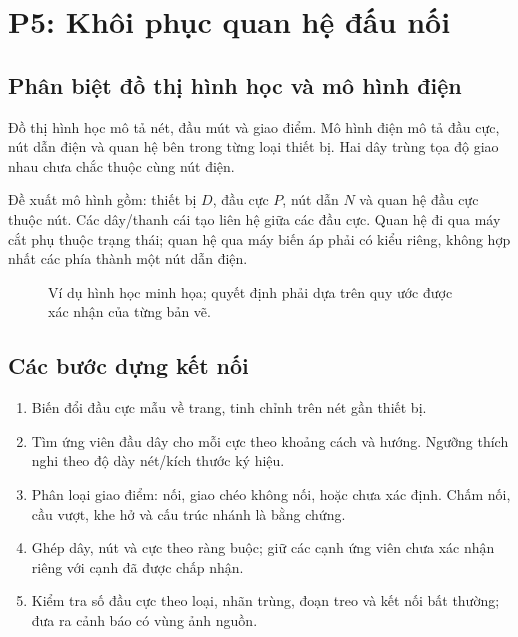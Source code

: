 \documentclass[11pt,a4paper]{article}
\begin{document}
\clearpage
\section{P5: Khôi phục quan hệ đấu nối}
\subsection{Phân biệt đồ thị hình học và mô hình điện}
Đồ thị hình học mô tả nét, đầu mút và giao điểm. Mô hình điện mô tả đầu cực, nút dẫn điện và quan hệ bên trong từng loại thiết bị. Hai dây trùng tọa độ giao nhau chưa chắc thuộc cùng nút điện.

Đề xuất mô hình gồm: thiết bị $D$, đầu cực $P$, nút dẫn $N$ và quan hệ đầu cực thuộc nút. Các dây/thanh cái tạo liên hệ giữa các đầu cực. Quan hệ đi qua máy cắt phụ thuộc trạng thái; quan hệ qua máy biến áp phải có kiểu riêng, không hợp nhất các phía thành một nút dẫn điện.

\begin{figure}[H]
\centering
{}
\caption{Ví dụ hình học minh họa; quyết định phải dựa trên quy ước được xác nhận của từng bản vẽ.}
\end{figure}

\subsection{Các bước dựng kết nối}
\begin{enumerate}
\item Biến đổi đầu cực mẫu về trang, tinh chỉnh trên nét gần thiết bị.
\item Tìm ứng viên đầu dây cho mỗi cực theo khoảng cách và hướng. Ngưỡng thích nghi theo độ dày nét/kích thước ký hiệu.
\item Phân loại giao điểm: nối, giao chéo không nối, hoặc chưa xác định. Chấm nối, cầu vượt, khe hở và cấu trúc nhánh là bằng chứng.
\item Ghép dây, nút và cực theo ràng buộc; giữ các cạnh ứng viên chưa xác nhận riêng với cạnh đã được chấp nhận.
\item Kiểm tra số đầu cực theo loại, nhãn trùng, đoạn treo và kết nối bất thường; đưa ra cảnh báo có vùng ảnh nguồn.
\end{enumerate}
\end{document}
